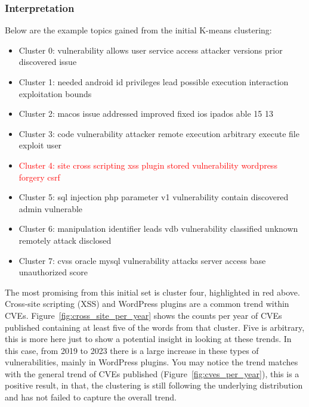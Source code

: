 \documentclass[12pt]{article}
\begin{document}
\subsubsection{Interpretation}

Below are the example topics gained from the initial K-means clustering:
\begin{itemize}

	\item Cluster 0: vulnerability allows user service access attacker versions prior discovered issue

	\item Cluster 1: needed android id privileges lead possible execution interaction exploitation bounds

	\item Cluster 2: macos issue addressed improved fixed ios ipados able 15 13

	\item Cluster 3: code vulnerability attacker remote execution arbitrary execute file exploit user

	\item \textcolor{red}{Cluster 4: site cross scripting xss plugin stored vulnerability wordpress
		      forgery csrf}

	\item Cluster 5: sql injection php parameter v1 vulnerability contain discovered
	      admin vulnerable

	\item Cluster 6: manipulation identifier leads vdb vulnerability classified unknown remotely attack disclosed

	\item Cluster 7: cvss oracle mysql vulnerability attacks server access base unauthorized score
\end{itemize}

The most promising from this initial set is cluster four, highlighted in red above. Cross-site
scripting (XSS) and WordPress plugins are a common trend within CVEs.
Figure~\ref{fig:cross_site_per_year} shows the counts per year of CVEs published containing at least
five of the words from that cluster. Five is arbitrary, this is more here just to show a potential
insight in looking at these trends. In this case, from 2019 to 2023 there is a large increase in
these types of vulnerabilities, mainly in WordPress plugins. You may notice the trend matches with
the general trend of CVEs published (Figure~\ref{fig:cves_per_year}), this is a positive result, in
that, the clustering is still following the underlying distribution and has not failed to capture
the overall trend.
\end{document}
